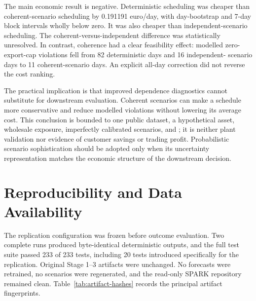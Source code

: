 \documentclass[10pt,twocolumn]{article}
\newcommand{\status}[1]{\texttt{\detokenize{#1}}}
\begin{document}
The main economic result is negative. Deterministic scheduling was cheaper than
coherent-scenario scheduling by 0.191191 euro/day, with day-bootstrap and 7-day
block intervals wholly below zero. It was also cheaper than independent-scenario
scheduling. The coherent-versus-independent difference was statistically
unresolved. In contrast, coherence had a clear feasibility effect: modelled
zero-export-cap violations fell from 82 deterministic days and 16 independent-
scenario days to 11 coherent-scenario days. An explicit all-day correction did
not reverse the cost ranking.

The practical implication is that improved dependence diagnostics cannot
substitute for downstream evaluation. Coherent scenarios can make a schedule
more conservative and reduce modelled violations without lowering its average
cost. This conclusion is bounded to one public dataset, a hypothetical asset,
wholesale exposure, imperfectly calibrated scenarios, and
\status{POST_PUBLICATION_TIMING_ASSUMED}; it is neither plant validation nor
evidence of customer savings or trading profit. Probabilistic scenario
sophistication should be adopted only when its uncertainty representation
matches the economic structure of the downstream decision.

\section{Reproducibility and Data Availability}
\label{sec:reproducibility}

The replication configuration was frozen before outcome evaluation. Two
complete runs produced byte-identical deterministic outputs, and the full test
suite passed 233 of 233 tests, including 20 tests introduced specifically for
the replication. Original Stage 1--3 artifacts were unchanged. No forecasts
were retrained, no scenarios were regenerated, and the read-only SPARK
repository remained clean. Table~\ref{tab:artifact-hashes} records the principal
artifact fingerprints.
\end{document}
